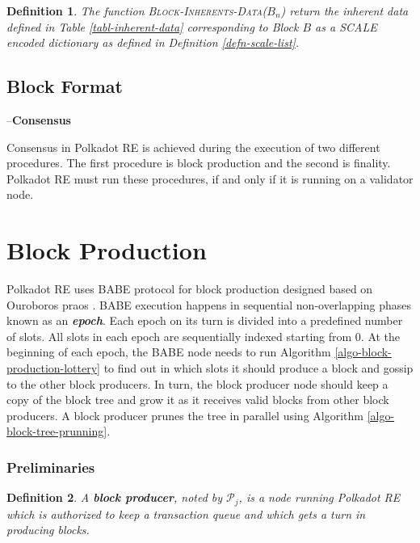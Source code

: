 \documentclass{article}
\newcommand{\chapter}[1]{\medskip\bigskip--\noindent\textbf{\huge #1}}
\newcommand{\tmem}[1]{{\em #1\/}}
\newcommand{\tmname}[1]{\textsc{#1}}
\newcommand{\tmstrong}[1]{\textbf{#1}}
\newcommand{\tmtextbf}[1]{{\bfseries{#1}}}
\newcommand{\tmtextit}[1]{{\itshape{#1}}}
\newcommand{\tmtextsc}[1]{{\scshape{#1}}}
\newtheorem{definition}{Definition}
\providecommand{\tmem}[1]{\tmtextit{#1}}
\providecommand{\tmname}[1]{\tmtextsc{#1}}
\providecommand{\tmstrong}[1]{\tmtextbf{#1}}
\providecommand{\tmtextbf}[1]{\tmtextbf{#1}}
\providecommand{\tmtextit}[1]{\tmtextit{#1}}
\newtheorem{definition}{Definition}
\begin{document}
\begin{definition}
  \label{defn-func-inherent-data}The function
  {\tmname{Block-Inherents-Data($B_n$)}} return the inherent data defined in
  Table \ref{tabl-inherent-data} corresponding to Block $B$ as a SCALE encoded
  dictionary as defined in Definition \ref{defn-scale-list}.
\end{definition}

\subsection{Block Format}

\chapter{Consensus}\label{chap-consensu}

Consensus in Polkadot RE is achieved during the execution of two different
procedures. The first procedure is block production and the second is
finality. Polkadot RE must run these procedures, if and only if it is running
on a validator node.

\section{Block Production}

Polkadot RE uses BABE protocol {\cite{w3f_research_group_blind_2019}} for
block production designed based on Ouroboros praos
{\cite{david_ouroboros_2018}}. BABE execution happens in sequential
non-overlapping phases known as an {\tmstrong{{\tmem{epoch}}}}. Each epoch on
its turn is divided into a predefined number of slots. All slots in each epoch
are sequentially indexed starting from 0. At the beginning of each epoch, the
BABE node needs to run Algorithm \ref{algo-block-production-lottery} to find
out in which slots it should produce a block and gossip to the other block
producers. In turn, the block producer node should keep a copy of the block
tree and grow it as it receives valid blocks from other block producers. A
block producer prunes the tree in parallel using Algorithm
\ref{algo-block-tree-prunning}.

\subsubsection{Preliminaries}

\begin{definition}
  A {\tmstrong{block producer}}, noted by $\mathcal{P}_j$, is a node running
  Polkadot RE which is authorized to keep a transaction queue and which gets a
  turn in producing blocks.
\end{definition}
\end{document}

